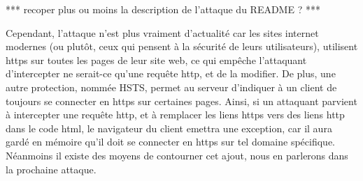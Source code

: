*** recoper plus ou moins la description de l'attaque du README ? ***

Cependant, l'attaque n'est plus vraiment d'actualité car les sites internet modernes (ou plutôt, ceux qui pensent à la sécurité de leurs utilisateurs), utilisent https sur toutes les pages de leur site web, ce qui empêche l'attaquant d'intercepter ne serait-ce qu'une requête http, et de la modifier. De plus, une autre protection, nommée HSTS, permet au serveur d'indiquer à un client de toujours se connecter en https sur certaines pages. Ainsi, si un attaquant parvient à intercepter une requête http, et à remplacer les liens https vers des liens http dans le code html, le navigateur du client emettra une exception, car il aura gardé en mémoire qu'il doit se connecter en https sur tel domaine spécifique. Néanmoins il existe des moyens de contourner cet ajout, nous en parlerons dans la prochaine attaque.
